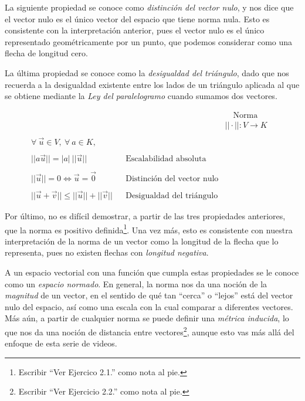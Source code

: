 \documentclass[12pt,dvipsnames]{article}
\numberwithin{equation}{section}
\begin{document}
La siguiente propiedad se conoce como \emph{distinción del vector nulo}, y nos dice que el vector nulo es el único vector del espacio que tiene norma nula. Esto es consistente con la interpretación anterior, pues el vector nulo es el único representado geométricamente por un punto, que podemos considerar como una flecha de longitud cero.

La última propiedad se conoce como la \emph{desigualdad del triángulo}, dado que nos recuerda a la desigualdad existente entre los lados de un triángulo aplicada al que se obtiene mediante la \emph{Ley del paralelogramo} cuando sumamos dos vectores.

\begin{align*}
     & & &\quad \text{Norma}& \\
     & & &||\cdot||:V\to K& \\
     \\
     \forall \ \vec{u}\in V, \ \forall \ a\in K, \\
     \\
     ||a\vec{u}|| = |a| \ ||\vec{u}|| & &\text{Escalabilidad absoluta}\\
     \\
     ||\vec{u}|| = 0 \iff \vec{u} = \vec{0} & &\text{Distinción del vector nulo}\\
     \\
     ||\vec{u}+\vec{v}|| \le ||\vec{u}|| + ||\vec{v}|| & &\text{Desigualdad del triángulo}
\end{align*}

Por último, no es difícil demostrar, a partir de las tres propiedades anteriores, que la norma es positivo definida\footnote{Escribir ``Ver Ejercico 2.1.'' como nota al pie.}. Una vez más, esto es consistente con nuestra interpretación de la norma de un vector como la longitud de la flecha que lo representa, pues no existen flechas con \emph{longitud negativa}.

A un espacio vectorial con una función que cumpla estas propiedades se le conoce como un \emph{espacio normado}. En general, la norma nos da una noción de la \emph{magnitud} de un vector, en el sentido de qué tan ``cerca'' o ``lejos'' está del vector nulo del espacio, así como una escala con la cual comparar a diferentes vectores. Más aún, a partir de cualquier norma se puede definir una \emph{métrica inducida}, lo que nos da una noción de distancia entre vectores\footnote{Escribir ``Ver Ejercicio 2.2.'' como nota al pie.}, aunque esto vas más allá del enfoque de esta serie de videos.
\end{document}
